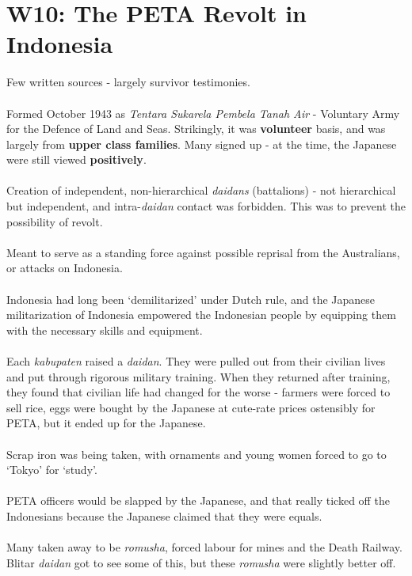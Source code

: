 \documentclass[a4paper]{article}
\begin{document}
\section{W10: The PETA Revolt in Indonesia}
Few written sources - largely survivor testimonies.\\
\\
Formed October 1943 as \textit{Tentara Sukarela Pembela Tanah Air} - Voluntary Army for the Defence of Land and Seas. Strikingly, it was \textbf{volunteer} basis, and was largely from \textbf{upper class families}. Many signed up - at the time, the Japanese were still viewed \textbf{positively}.\\
\\
Creation of independent, non-hierarchical \textit{daidans} (battalions) - not hierarchical but independent, and intra-\textit{daidan} contact was forbidden. This was to prevent the possibility of revolt.\\
\\
Meant to serve as a standing force against possible reprisal from the Australians, or attacks on Indonesia.\\
\\
Indonesia had long been `demilitarized' under Dutch rule, and the Japanese militarization of Indonesia empowered the Indonesian people by equipping them with the necessary skills and equipment.\\
\\
Each \textit{kabupaten} raised a \textit{daidan}. They were pulled out from their civilian lives and put through rigorous military training. When they returned after training, they found that civilian life had changed for the worse - farmers were forced to sell rice, eggs were bought by the Japanese at cute-rate prices ostensibly for PETA, but it ended up for the Japanese.\\
\\
Scrap iron was being taken, with ornaments and young women forced to go to `Tokyo' for `study'. \\
\\
PETA officers would be slapped by the Japanese, and that really ticked off the Indonesians because the Japanese claimed that they were equals.\\
\\
Many taken away to be \textit{romusha}, forced labour for mines and the Death Railway. Blitar \textit{daidan} got to see some of this, but these \textit{romusha} were slightly better off.\\
\\
\end{document}
